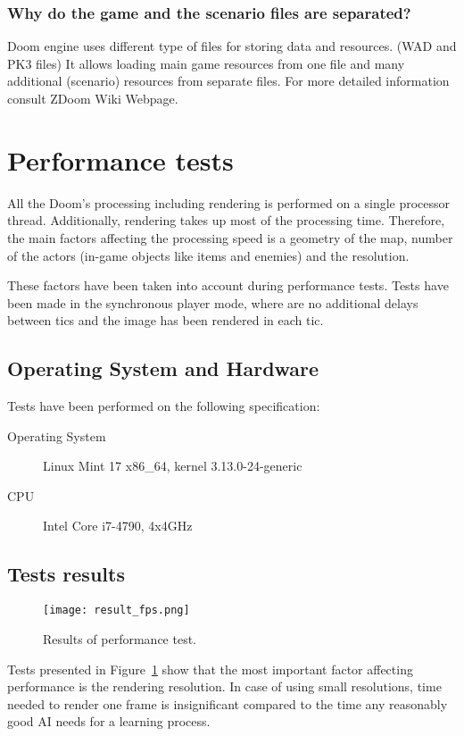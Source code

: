 \subsubsection{Why do the game and the scenario files are separated?}

Doom engine uses different type of files for storing data and resources. (WAD and PK3 files) It allows loading main game resources from one file and many additional (scenario) resources from separate files. For more detailed information consult ZDoom Wiki Webpage\cite{zdoom-wiki}.

\section{Performance tests}\label{sec:performance}

All the Doom's processing including rendering is performed on a single processor thread. Additionally, rendering takes up most of the processing time. Therefore, the main factors affecting the processing speed is a geometry of the map, number of the actors (in-game objects like items and enemies) and the resolution. 

These factors have been taken into account during performance tests. Tests have been made in the synchronous player mode, where are no additional delays between tics and the image has been rendered in each tic.

	\subsection{Operating System and Hardware}
	
	Tests have been performed on the following specification:
	
	\begin{description}
		\item[Operating System] Linux Mint 17 x86\_64, kernel 3.13.0-24-generic
		\item[CPU] Intel Core i7-4790, 4x4GHz
	\end{description}

\subsection{Tests results}

\begin{figure}
\centering
\texttt{[image: result\_fps.png]}
\caption{Results of performance test.}
\label{fig:fps_test}
\end{figure}

Tests presented in Figure~\ref{fig:fps_test} show that the most important factor affecting performance is the rendering resolution. In case of using small resolutions, time needed to render one frame is insignificant compared to the time any reasonably good AI needs for a learning process.



